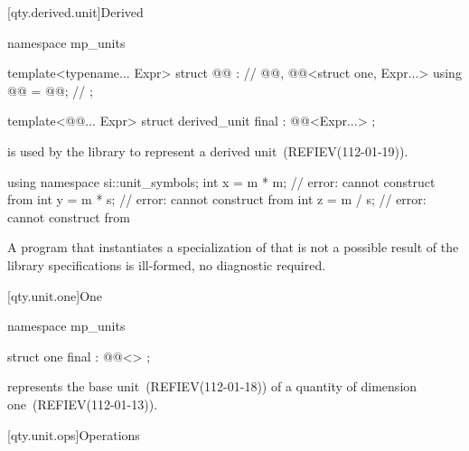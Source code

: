 [qty.derived.unit]{Derived}

\begin{codeblock}
namespace mp_units {

template<typename... Expr>
struct @@ :              // \expos
    @@,
    @@<struct one, Expr...> {
  using @@ = @@;  // \expos
};

template<@@... Expr>
struct derived_unit final : @@<Expr...> {};

}
\end{codeblock}

\pnum
{} is used by the library
to represent a derived unit~(REFIEV(112-01-19)).
\begin{example}
\begin{codeblock}
using namespace si::unit_symbols;
int x = m * m;  // error: cannot construct from 
int y = m * s;  // error: cannot construct from 
int z = m / s;  // error: cannot construct from 
\end{codeblock}
\end{example}
A program that instantiates a specialization of 
that is not a possible result of the library specifications
is ill-formed, no diagnostic required.

[qty.unit.one]{One}

\begin{codeblock}
namespace mp_units {

struct one final : @@<> {};

}
\end{codeblock}

\pnum
{} represents the base unit~(REFIEV(112-01-18)) of a quantity of dimension one~(REFIEV(112-01-13)).

[qty.unit.ops]{Operations}


